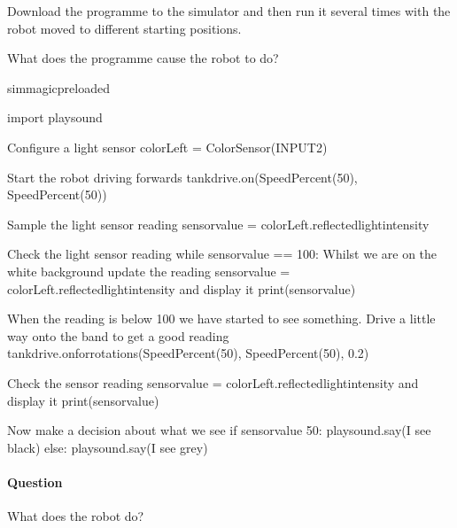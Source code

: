 \documentclass[letterpaper,10pt,english]{sphinxmanual}
\begin{document}
Download the programme to the simulator and then run it several times with the robot moved to different starting positions.

What does the programme cause the robot to do?

{
\begin{sphinxVerbatim}[commandchars=\\\{\}]
\llap{\color{nbsphinxin}[ ]:\,\hspace{\fboxrule}\hspace{\fboxsep}}\PYGZpc{}\PYGZpc{}sim\PYGZus{}magic\PYGZus{}preloaded

import playsound

\PYGZsh{} Configure a light sensor
colorLeft = ColorSensor(INPUT\PYGZus{}2)

\PYGZsh{} Start the robot driving forwards
tank\PYGZus{}drive.on(SpeedPercent(50), SpeedPercent(50))

\PYGZsh{}Sample the light sensor reading
sensor\PYGZus{}value = colorLeft.reflected\PYGZus{}light\PYGZus{}intensity

\PYGZsh{}Check the light sensor reading
while sensor\PYGZus{}value == 100:
    \PYGZsh{} Whilst we are on the white background
    \PYGZsh{} update the reading
    sensor\PYGZus{}value = colorLeft.reflected\PYGZus{}light\PYGZus{}intensity
    \PYGZsh{} and display it
    print(sensor\PYGZus{}value)

\PYGZsh{} When the reading is below 100
\PYGZsh{} we have started to see something.
\PYGZsh{} Drive a little way onto the band to get a good reading
tank\PYGZus{}drive.on\PYGZus{}for\PYGZus{}rotations(SpeedPercent(50), SpeedPercent(50), 0.2)

\PYGZsh{}Check the sensor reading
sensor\PYGZus{}value = colorLeft.reflected\PYGZus{}light\PYGZus{}intensity
\PYGZsh{} and display it
print(sensor\PYGZus{}value)

\PYGZsh{} Now make a decision about what we see
if sensor\PYGZus{}value \PYGZlt{} 50:
    playsound.say(\PYGZdq{}I see black\PYGZdq{})
else:
    playsound.say(\PYGZdq{}I see grey\PYGZdq{})
\end{sphinxVerbatim}
}


\paragraph{Question}
\label{\detokenize{content/02_Robot_Lab/Section_00_02:Question}}
What does the robot do?
\end{document}
